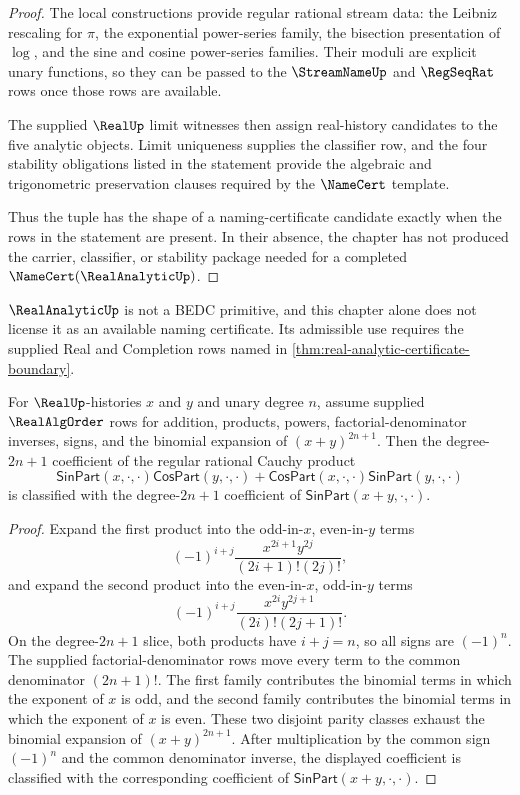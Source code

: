 \begin{proof}
The local constructions provide regular rational stream data: the Leibniz rescaling for $\pi$, the exponential power-series family, the bisection presentation of $\log$, and the sine and cosine power-series families. Their moduli are explicit unary functions, so they can be passed to the $\StreamNameUp$ and $\RegSeqRat$ rows once those rows are available.

The supplied $\RealUp$ limit witnesses then assign real-history candidates to the five analytic objects. Limit uniqueness supplies the classifier row, and the four stability obligations listed in the statement provide the algebraic and trigonometric preservation clauses required by the $\NameCert$ template.

Thus the tuple has the shape of a naming-certificate candidate exactly when the rows in the statement are present. In their absence, the chapter has not produced the carrier, classifier, or stability package needed for a completed $\NameCert(\RealAnalyticUp)$.
\end{proof}

\begin{corollary}
\label{cor:real-analytic-primitive-boundary}
$\RealAnalyticUp$ is not a BEDC primitive, and this chapter alone does not license it as an available naming certificate. Its admissible use requires the supplied Real and Completion rows named in \autoref{thm:real-analytic-certificate-boundary}.
\end{corollary}

\begin{lemma}
\label{lem:real-analytic-odd-trig-cauchy-product-split}
For $\RealUp$-histories $x$ and $y$ and unary degree $n$, assume supplied $\RealAlgOrder$ rows for addition, products, powers, factorial-denominator inverses, signs, and the binomial expansion of $(x+y)^{2n+1}$. Then the degree-$2n+1$ coefficient of the regular rational Cauchy product
$$
\mathsf{SinPart}(x,\cdot,\cdot)\mathsf{CosPart}(y,\cdot,\cdot)
+
\mathsf{CosPart}(x,\cdot,\cdot)\mathsf{SinPart}(y,\cdot,\cdot)
$$
is classified with the degree-$2n+1$ coefficient of $\mathsf{SinPart}(x+y,\cdot,\cdot)$.
\end{lemma}
\begin{proof}
Expand the first product into the odd-in-$x$, even-in-$y$ terms
$$
(-1)^{i+j}\frac{x^{2i+1}y^{2j}}{(2i+1)!(2j)!},
$$
and expand the second product into the even-in-$x$, odd-in-$y$ terms
$$
(-1)^{i+j}\frac{x^{2i}y^{2j+1}}{(2i)!(2j+1)!}.
$$
On the degree-$2n+1$ slice, both products have $i+j=n$, so all signs are $(-1)^n$. The supplied factorial-denominator rows move every term to the common denominator $(2n+1)!$. The first family contributes the binomial terms in which the exponent of $x$ is odd, and the second family contributes the binomial terms in which the exponent of $x$ is even. These two disjoint parity classes exhaust the binomial expansion of $(x+y)^{2n+1}$. After multiplication by the common sign $(-1)^n$ and the common denominator inverse, the displayed coefficient is classified with the corresponding coefficient of $\mathsf{SinPart}(x+y,\cdot,\cdot)$.
\end{proof}

